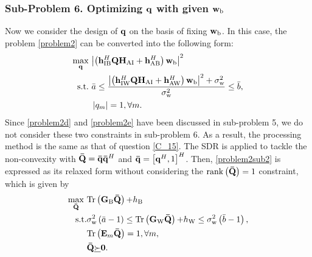 \documentclass[10pt,journal,letterpaper,twocolumn,twoside]{IEEEtran} %
\begin{document}
  \subsubsection{{{Sub-Problem 6. Optimizing ${\bf{q}}$ with given ${{\mathbf{w}}_{\rm{b}}}$}}}

Now we consider the design of ${\bf{q}}$ on the basis of fixing  ${{\mathbf{w}}_{\rm{b}}}$.
In this case, the problem \eqref{problem2} can be converted into the following form:
 \begin{subequations}\label{problem2sub2}
\begin{align}
 \mathop {\max }\limits_{{\bf{q}}} ~&{{{{\left| {\left( {{\bf{h}}_{{\rm{IB}}}^H{\bf{Q}}{{\bf{H}}_{{\rm{AI}}}} + {\bf{h}}_{{\rm{AB}}}^H} \right){{\bf{w}}_{\rm{b}}}} \right|}^2}}}\\
{\rm{s.t.}}~&\bar a \le \frac{{{\left| {\left( {{\bf{h}}_{{\rm{IW}}}^H{\bf{Q}}{{\bf{H}}_{{\rm{AI}}}} + {\bf{h}}_{{\rm{AW}}}^H} \right){{\bf{w}}_{\rm{b}}}} \right|^{\rm{2}}} + \sigma _{\rm{w}}^2}}{{\sigma _{\rm{w}}^2}} \le \bar b,\label{problem2sub2a}\\
 &\left| {{q_m}} \right| = 1,\forall m.\label{problem2sub2b}
 \end{align}
\end{subequations}
Since \eqref{problem2d} and \eqref{problem2e} have been discussed in sub-problem 5, we do not consider these two constraints in sub-problem 6. As a result, the processing method is the same as that of question \eqref{C_15}.
The SDR is applied
to tackle the non-convexity with ${\bf{\bar Q}} = {\bf{\bar q}}{{{\bf{\bar q}}}^H}$ and ${\bf{\bar q}} = {\left[ {{{\bf{q}}^H},1} \right]^H}$. Then, \eqref{problem2sub2} is expressed as its relaxed form without considering
the ${\rm{rank}}\left( {{\bf{{\bar Q}}}} \right) = 1$ constraint, which is given by
    \begin{subequations}\label{2sub2sdr}
\begin{align}
\mathop {\max }\limits_{{\bf{\bar Q}}} ~& {{\rm{Tr}}\left( {{{\bf{G}}_{\rm{B}}}{\bf{\bar Q}}} \right){\rm{ + }}{h_{\rm{B}}}} \\
{\rm{s}}.{\rm{t}}.&\sigma _{\rm{w}}^2\left( {\bar a - 1} \right) \le {\rm{Tr}}\left( {{{\bf{G}}_{\rm{W}}}{\bf{\bar Q}}} \right){\rm{ + }}{h_{\rm{W}}}\le \sigma _{\rm{w}}^2\left( {\bar b - 1} \right),\\
&{\rm{Tr}}\left( {{{\bf{E}}_m}{\bf{\bar Q}}} \right) = 1,\forall m,\\
&{\bf{\bar Q}}\underline  \succ  {\bf{0}}.
 \end{align}
\end{subequations}
\end{document}
